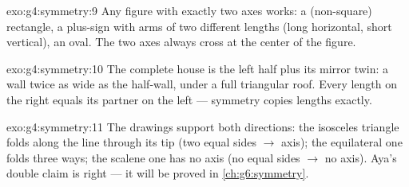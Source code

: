\begin{solution}{exo:g4:symmetry:9}
Any figure with exactly two axes works: a (non-square) rectangle, a
plus-sign with arms of two different lengths (long horizontal, short
vertical), an oval. The two axes always cross at the center of the
figure.
\end{solution}

\begin{solution}{exo:g4:symmetry:10}
The complete house is the left half plus its mirror twin: a wall
twice as wide as the half-wall, under a full triangular roof. Every
length on the right equals its partner on the left --- symmetry
copies lengths exactly.
\end{solution}

\begin{solution}{exo:g4:symmetry:11}
The drawings support both directions: the isosceles triangle folds
along the line through its tip (two equal sides $\to$ axis); the
equilateral one folds three ways; the scalene one has no axis (no
equal sides $\to$ no axis). Aya's double claim is right --- it will
be proved in \cref{ch:g6:symmetry}.
\end{solution}
